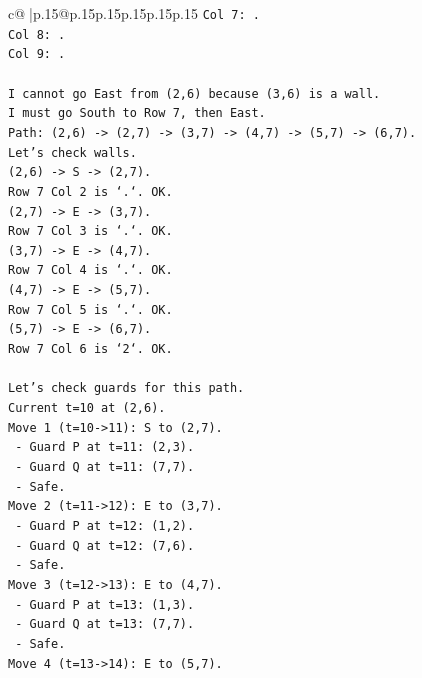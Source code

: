 \documentclass{article}
\begin{document}
{\begin{supertabular}{c@{$\;$}|p{.15\linewidth}@{}p{.15\linewidth}p{.15\linewidth}p{.15\linewidth}p{.15\linewidth}p{.15\linewidth}}
{{{\texttt{Col 7: .} \\
\texttt{Col 8: .} \\
\texttt{Col 9: .} \\
\\ 
\texttt{I cannot go East from (2,6) because (3,6) is a wall.} \\
\texttt{I must go South to Row 7, then East.} \\
\texttt{Path: (2,6) {-}> (2,7) {-}> (3,7) {-}> (4,7) {-}> (5,7) {-}> (6,7).} \\
\texttt{Let's check walls.} \\
\texttt{(2,6) {-}> S {-}> (2,7).} \\
\texttt{Row 7 Col 2 is `.`. OK.} \\
\texttt{(2,7) {-}> E {-}> (3,7).} \\
\texttt{Row 7 Col 3 is `.`. OK.} \\
\texttt{(3,7) {-}> E {-}> (4,7).} \\
\texttt{Row 7 Col 4 is `.`. OK.} \\
\texttt{(4,7) {-}> E {-}> (5,7).} \\
\texttt{Row 7 Col 5 is `.`. OK.} \\
\texttt{(5,7) {-}> E {-}> (6,7).} \\
\texttt{Row 7 Col 6 is `2`. OK.} \\
\\ 
\texttt{Let's check guards for this path.} \\
\texttt{Current t=10 at (2,6).} \\
\texttt{Move 1 (t=10{-}>11): S to (2,7).} \\
\texttt{  {-} Guard P at t=11: (2,3).} \\
\texttt{  {-} Guard Q at t=11: (7,7).} \\
\texttt{  {-} Safe.} \\
\texttt{Move 2 (t=11{-}>12): E to (3,7).} \\
\texttt{  {-} Guard P at t=12: (1,2).} \\
\texttt{  {-} Guard Q at t=12: (7,6).} \\
\texttt{  {-} Safe.} \\
\texttt{Move 3 (t=12{-}>13): E to (4,7).} \\
\texttt{  {-} Guard P at t=13: (1,3).} \\
\texttt{  {-} Guard Q at t=13: (7,7).} \\
\texttt{  {-} Safe.} \\
\texttt{Move 4 (t=13{-}>14): E to (5,7).} \\
}}}
\end{supertabular}}
\end{document}
